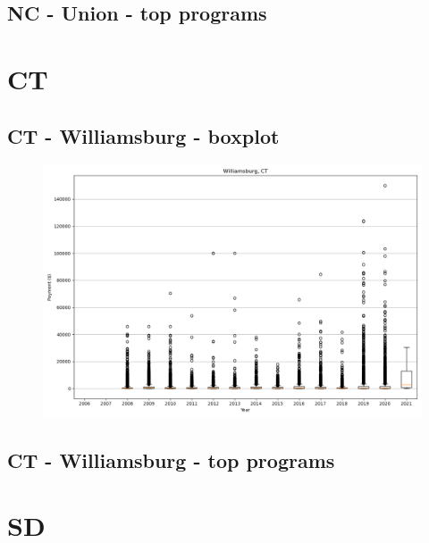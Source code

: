 \subsection*{NC - Union - top programs}

\newpage
\section*{CT}
\subsection*{CT - Williamsburg - boxplot}
\begin{figure}[h]
\centering
\includegraphics[width=7in]{../output/boxplots/counties/Williamsburg-CT_boxplot.png}
\end{figure}


\subsection*{CT - Williamsburg - top programs}

\newpage
\section*{SD}
